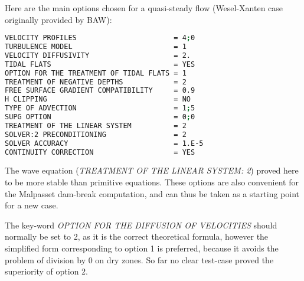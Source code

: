  Here are the main options chosen for a quasi-steady flow (Wesel-Xanten case originally provided by BAW):
\begin{lstlisting}[language=bash]
VELOCITY PROFILES                       = 4;0
TURBULENCE MODEL                        = 1
VELOCITY DIFFUSIVITY                    = 2.
TIDAL FLATS                             = YES
OPTION FOR THE TREATMENT OF TIDAL FLATS = 1
TREATMENT OF NEGATIVE DEPTHS            = 2
FREE SURFACE GRADIENT COMPATIBILITY     = 0.9
H CLIPPING                              = NO
TYPE OF ADVECTION                       = 1;5
SUPG OPTION                             = 0;0
TREATMENT OF THE LINEAR SYSTEM          = 2
SOLVER:2 PRECONDITIONING                = 2
SOLVER ACCURACY                         = 1.E-5
CONTINUITY CORRECTION                   = YES
\end{lstlisting}
The wave equation (\textit{TREATMENT OF THE LINEAR SYSTEM: 2}) proved here to be more stable than primitive equations.
These options are also convenient for the Malpasset dam-break computation, and can thus be taken as a starting point for a new case.

The key-word \textit{OPTION FOR THE DIFFUSION OF VELOCITIES} should normally be set to 2, as it is the correct theoretical formula, however the simplified form corresponding to option 1 is preferred, because it avoids the problem of division by 0 on dry zones. So far no clear test-case proved the superiority of option 2.
